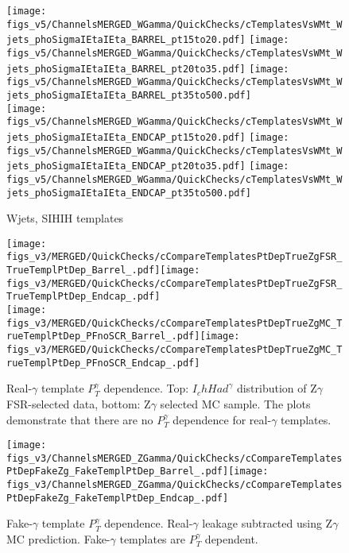 \begin{figure}[htb]
  \begin{center}
  \texttt{[image: figs\_v5/ChannelsMERGED\_WGamma/QuickChecks/cTemplatesVsWMt\_Wjets\_phoSigmaIEtaIEta\_BARREL\_pt15to20.pdf]} \texttt{[image: figs\_v5/ChannelsMERGED\_WGamma/QuickChecks/cTemplatesVsWMt\_Wjets\_phoSigmaIEtaIEta\_BARREL\_pt20to35.pdf]} \texttt{[image: figs\_v5/ChannelsMERGED\_WGamma/QuickChecks/cTemplatesVsWMt\_Wjets\_phoSigmaIEtaIEta\_BARREL\_pt35to500.pdf]}\\
  \texttt{[image: figs\_v5/ChannelsMERGED\_WGamma/QuickChecks/cTemplatesVsWMt\_Wjets\_phoSigmaIEtaIEta\_ENDCAP\_pt15to20.pdf]} \texttt{[image: figs\_v5/ChannelsMERGED\_WGamma/QuickChecks/cTemplatesVsWMt\_Wjets\_phoSigmaIEtaIEta\_ENDCAP\_pt20to35.pdf]} \texttt{[image: figs\_v5/ChannelsMERGED\_WGamma/QuickChecks/cTemplatesVsWMt\_Wjets\_phoSigmaIEtaIEta\_ENDCAP\_pt35to500.pdf]}\\
  \caption{Wjets, SIHIH templates}
  \label{fig:templatesVsWMt_Wjets_SIHIH}
  \end{center}
\end{figure}

\begin{figure}[htb]
  \begin{center}
  \texttt{[image: figs\_v3/MERGED/QuickChecks/cCompareTemplatesPtDepTrueZgFSR\_TrueTemplPtDep\_Barrel\_.pdf]}\texttt{[image: figs\_v3/MERGED/QuickChecks/cCompareTemplatesPtDepTrueZgFSR\_TrueTemplPtDep\_Endcap\_.pdf]}\\
  \texttt{[image: figs\_v3/MERGED/QuickChecks/cCompareTemplatesPtDepTrueZgMC\_TrueTemplPtDep\_PFnoSCR\_Barrel\_.pdf]}\texttt{[image: figs\_v3/MERGED/QuickChecks/cCompareTemplatesPtDepTrueZgMC\_TrueTemplPtDep\_PFnoSCR\_Endcap\_.pdf]}\\  
  \caption{Real-$\gamma$ template $P_{T}^{\gamma}$ dependence. Top: $I_chHad^{\gamma}$ distribution of Z$\gamma$ FSR-selected data, bottom: Z$\gamma$ selected MC sample. The plots demonstrate that there are no $P_{T}^{\gamma}$ dependence for real-$\gamma$ templates.}
  \label{fig:compareTemplatesTruePtDep}
  \end{center}
\end{figure}

\begin{figure}[htb]
  \begin{center}
  \texttt{[image: figs\_v3/ChannelsMERGED\_ZGamma/QuickChecks/cCompareTemplatesPtDepFakeZg\_FakeTemplPtDep\_Barrel\_.pdf]}\texttt{[image: figs\_v3/ChannelsMERGED\_ZGamma/QuickChecks/cCompareTemplatesPtDepFakeZg\_FakeTemplPtDep\_Endcap\_.pdf]}\\
  \caption{Fake-$\gamma$ template $P_{T}^{\gamma}$ dependence. Real-$\gamma$ leakage subtracted using Z$\gamma$ MC prediction. Fake-$\gamma$ templates are $P_{T}^{\gamma}$ dependent.}
  \label{fig:compareTemplatesFakePtDep}
  \end{center}
\end{figure}
